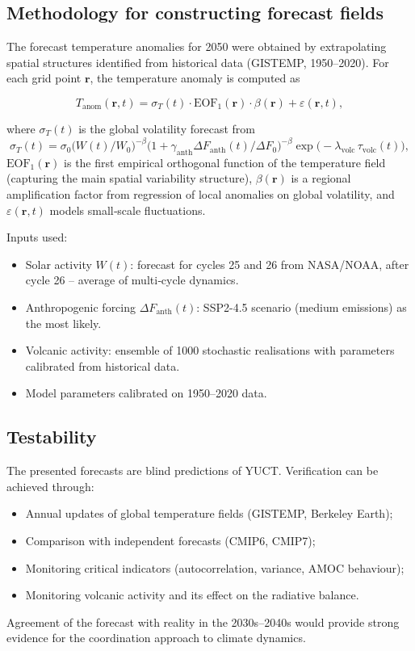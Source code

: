 \documentclass[12pt,a4paper]{article}
\begin{document}
	\subsection{Methodology for constructing forecast fields}
	
	The forecast temperature anomalies for 2050 were obtained by extrapolating spatial structures identified from historical data (GISTEMP, 1950–2020). For each grid point \(\mathbf{r}\), the temperature anomaly is computed as
	
	\[
	T_{\mathrm{anom}}(\mathbf{r},t) = \sigma_T(t) \cdot \mathrm{EOF}_1(\mathbf{r}) \cdot \beta(\mathbf{r}) + \varepsilon(\mathbf{r},t),
	\]
	
	where \(\sigma_T(t)\) is the global volatility forecast from
	\[
	\sigma_T(t) = \sigma_0 \bigl( W(t)/W_0 \bigr)^{-\beta} \bigl(1 + \gamma_{\mathrm{anth}} \Delta F_{\mathrm{anth}}(t)/\Delta F_0\bigr)^{-\beta} \exp\!\bigl(-\lambda_{\text{volc}} \,\tau_{\text{volc}}(t)\bigr),
	\]
	\(\mathrm{EOF}_1(\mathbf{r})\) is the first empirical orthogonal function of the temperature field (capturing the main spatial variability structure), \(\beta(\mathbf{r})\) is a regional amplification factor from regression of local anomalies on global volatility, and \(\varepsilon(\mathbf{r},t)\) models small‑scale fluctuations.
	
	Inputs used:
	\begin{itemize}
		\item Solar activity \(W(t)\): forecast for cycles 25 and 26 from NASA/NOAA, after cycle 26 – average of multi‑cycle dynamics.
		\item Anthropogenic forcing \(\Delta F_{\mathrm{anth}}(t)\): SSP2-4.5 scenario (medium emissions) as the most likely.
		\item Volcanic activity: ensemble of 1000 stochastic realisations with parameters calibrated from historical data.
		\item Model parameters calibrated on 1950–2020 data.
	\end{itemize}
	
	\subsection{Testability}
	
	The presented forecasts are blind predictions of YUCT. Verification can be achieved through:
	\begin{itemize}
		\item Annual updates of global temperature fields (GISTEMP, Berkeley Earth);
		\item Comparison with independent forecasts (CMIP6, CMIP7);
		\item Monitoring critical indicators (autocorrelation, variance, AMOC behaviour);
		\item Monitoring volcanic activity and its effect on the radiative balance.
	\end{itemize}
	Agreement of the forecast with reality in the 2030s–2040s would provide strong evidence for the coordination approach to climate dynamics.
	
\end{document}
